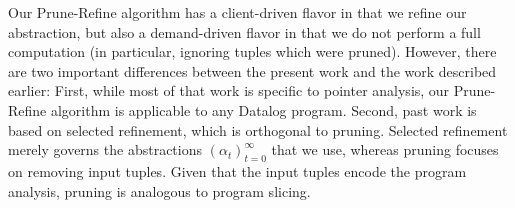 Our Prune-Refine algorithm has a client-driven flavor in that we
refine our abstraction, but also a demand-driven flavor in that we do
not perform a full computation (in particular, ignoring tuples which were
pruned).  However, there are two important differences between the present work
and the work described earlier:
First, while most of that work is specific to pointer analysis, our Prune-Refine algorithm
is applicable to any Datalog program.
Second, past work is based on selected refinement,
which is orthogonal to pruning.
Selected refinement merely governs the abstractions $(\alpha_t)_{t=0}^\infty$ that we use,
whereas pruning focuses on removing input tuples.
Given that the input tuples encode the program analysis,
pruning is analogous to program slicing.


%



